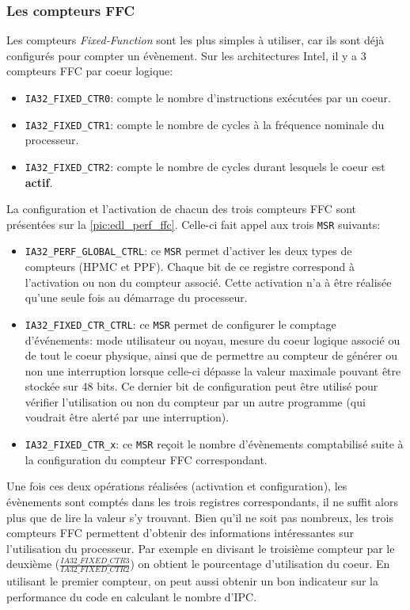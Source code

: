     
        \subsubsection{Les compteurs FFC}
        
            Les compteurs \textit{Fixed-Function} sont les plus simples à utiliser, car ils sont déjà configurés pour compter un évènement. Sur les architectures Intel, il y a 3 compteurs FFC par coeur logique:
            \begin{itemize}
                \item \verb|IA32_FIXED_CTR0|: compte le nombre d'instructions exécutées par un coeur. 
                \item \verb|IA32_FIXED_CTR1|: compte le nombre de cycles à la fréquence nominale du processeur.
                \item \verb|IA32_FIXED_CTR2|: compte le nombre de cycles durant lesquels le coeur est \textbf{actif}. 
            \end{itemize}
            
            La configuration et l'activation de chacun des trois compteurs FFC sont présentées sur la \autoref{pic:edl_perf_ffc}. Celle-ci fait appel aux trois \verb|MSR| suivants:
            \begin{itemize}
                \item \verb|IA32_PERF_GLOBAL_CTRL|: ce \verb|MSR| permet d'activer les deux types de compteurs (HPMC et PPF). Chaque bit de ce registre correspond à l'activation ou non du compteur associé. Cette activation n'a à être réalisée qu'une seule fois au démarrage du processeur.
                \item \verb|IA32_FIXED_CTR_CTRL|: ce \verb|MSR| permet de configurer le comptage d'événements: mode utilisateur ou noyau, mesure du coeur logique associé ou de tout le coeur physique, ainsi que de permettre au compteur de générer ou non une interruption lorsque celle-ci dépasse la valeur maximale pouvant être stockée sur 48 bits. Ce dernier bit de configuration peut être utilisé pour vérifier l'utilisation ou non du compteur par un autre programme (qui voudrait être alerté par une interruption).
                \item \verb|IA32_FIXED_CTR_x|: ce \verb|MSR| reçoit le nombre d'évènements comptabilisé suite à la configuration du compteur FFC correspondant.
            \end{itemize}
            
            Une fois ces deux opérations réalisées (activation et configuration), les évènements sont comptés dans les trois registres correspondants, il ne suffit alors plus que de lire la valeur s'y trouvant. Bien qu'il ne soit pas nombreux, les trois compteurs FFC permettent d'obtenir des informations intéressantes sur l'utilisation du processeur. Par exemple en divisant le troisième compteur par le deuxième ($\frac{IA32\_FIXED\_CTR3}{IA32\_FIXED\_CTR2}$) on obtient le pourcentage d'utilisation du coeur. En utilisant le premier compteur, on peut aussi obtenir un bon indicateur sur la performance du code en calculant le nombre d'\gls{IPC}.
            
